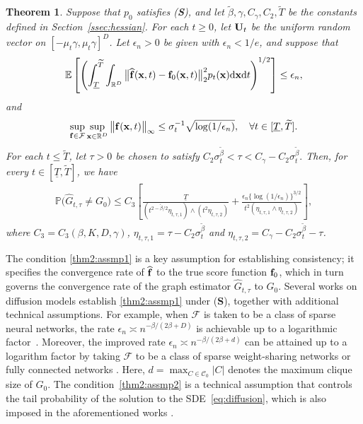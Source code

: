 \documentclass[11pt,a4paper,final]{article}
\numberwithin{equation}{section}
\newtheorem{theorem}{Theorem}[section]
\theoremstyle{remark}
\def\cC{\mathcal C}
\def\cF{\mathcal F}
\newcommand{\bff}{{\bf f}}
\newcommand{\bS}{{\bf S}}
\newcommand{\bU}{{\bf U}}
\newcommand{\bx}{{\bf x}}
\newcommand{\bbE}{{\mathbb E}}
\newcommand{\bbR}{{\mathbb R}}
\newcommand{\bbP}{{\mathbb P}}
\newcommand{\be}{\begin{equation}}
\newcommand{\ee}{\end{equation}}
\newcommand{\bean}{\setlength\arraycolsep{1pt}\begin{eqnarray*}}
\newcommand{\eean}{\end{eqnarray*}}
\def\d{{\rm d}}
\begin{document}
\begin{theorem}
\label{thm2}
Suppose that $p_{0}$ satisfies (\bS), and let $\tilde \beta, \gamma, C_{\gamma}, C_{2}, {\widetilde T}$ be the constants defined in Section~\ref{ssec:hessian}.
For each $t \geq 0$, let $\bU_{t}$ be the uniform random vector on $[-\mu_{t}\gamma, \mu_{t}\gamma]^{D}$.
Let $\epsilon_{n} > 0$ be given with $\epsilon_{n} < 1/e$, and suppose that
\be
\bbE \left[ \left( \int_{\underline{T}}^{{\widetilde T}} \int_{\bbR^{D}} \big\| \widehat \bff(\bx,t) - \bff_0(\bx, t)  \big\|_2^2 p_{t}(\bx) \d \bx \d t \right)^{1/2} \right]
 \leq \epsilon_{n},
 \label{thm2:assmp1}
\ee
and
\be
 \sup_{\bff \in \cF } \sup_{ \bx \in \bbR^{D}} \big\| \bff( \bx, t) \big\|_{\infty} \leq  \sigma_{t}^{-1} \sqrt{\log (1/\epsilon_n)},
 \quad \forall t \in [\underline{T}, {\widetilde T}].
  \label{thm2:assmp2}
\ee
For each $t \leq {\widetilde T}$, let $\tau > 0$ be chosen to satisfy 
$
C_{2} \sigma_{t}^{\tilde \beta} < \tau < C_{\gamma} - C_{2} \sigma_{t}^{\tilde \beta}.
$
Then, for every $t \in [\underline{T}, {\widetilde T}]$, we have 
\bean
\bbP \Big( \widehat G_{t,\tau} \neq G_{0} \Big)
\leq C_{3} \left[
\frac{\underline{T}}{ (  t^{2 -\tilde \beta / 2} \eta_{t,\tau,1} ) \wedge ( t^2 \eta_{t,\tau,2} ) }
+
\frac{ \epsilon_n  \{ \log (1/\epsilon_n) \}^{ 3/2 } }{ t^2 ( \eta_{t,\tau,1} \wedge \eta_{t,\tau,2} ) } 
\right],
\eean
where $C_{3} = C_{3} (\beta, K, D, \gamma )$, $\eta_{t,\tau,1} = \tau - C_{2} \sigma_{t}^{\tilde \beta}$ and $\eta_{t,\tau,2} = C_{\gamma} - C_{2} \sigma_{t}^{\tilde \beta} - \tau$.

\end{theorem}

The condition \eqref{thm2:assmp1} is a key assumption for establishing consistency; it specifies the convergence rate of $\widehat \bff$ to the true score function $\bff_{0}$, which in turn governs the convergence rate of the graph estimator $\widehat G_{t,\tau}$ to $G_{0}$.
Several works on diffusion models establish \eqref{thm2:assmp1} under (\bS), together with additional technical assumptions.
For example, when $\cF$ is taken to be a class of sparse neural networks, the rate $\epsilon_{n} \asymp n^{-\beta/(2\beta+D)}$ is achievable up to a logarithmic factor~\citep{oko2023diffusion}.
Moreover, the improved rate $\epsilon_{n} \asymp n^{-\beta/(2\beta+d)}$ can be attained up to a logarithm factor by taking $\cF$ to be a class of sparse weight-sharing networks \citep{kwon2026nonparametric} or fully connected networks \citep{fan2025optimal}.
Here, $d = \max_{C \in \cC_{0}} \vert C \vert$ denotes the maximum clique size of $G_{0}$.
The condition~\eqref{thm2:assmp2} is a technical assumption that controls the tail probability of the solution to the SDE~\eqref{eq:diffusion}, which is also imposed in the aforementioned works \citep{oko2023diffusion, kwon2026nonparametric, fan2025optimal}.
\end{document}
